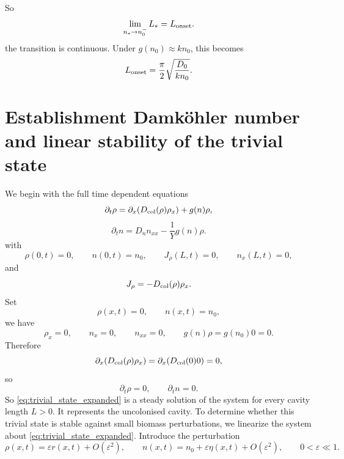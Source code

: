 \documentclass[11pt,a4paper]{report}
\begin{document}
	So
	\begin{equation}
		{
			\lim_{n_*\to n_0^-}L_*
			=
			L_{\rm onset}.
		}
		\label{eq:Lstar_to_Lonset_box}
	\end{equation}
	the transition is continuous.
	Under $g(n_0)\approx kn_0$, this becomes
	\[
	L_{\rm onset}
	=
	\frac{\pi}{2}\sqrt{\frac{D_0}{kn_0}}.
	\]	
	
	\section{Establishment Damköhler number and linear stability of the trivial state}
	\label{sec:trivial}
	We begin with the full time dependent equations
	\begin{equation}
		\partial_t \rho
		=
		\partial_x\!\left(D_{\rm col}(\rho)\rho_x\right)
		+
		g(n)\rho,
		\label{eq:full_biomass_time_expanded}
	\end{equation}
	\begin{equation}
		\partial_t n
		=
		D_n n_{xx}
		-
		\frac{1}{Y}g(n)\rho.
		\label{eq:full_nutrient_time_expanded}
	\end{equation}
	with
	\begin{equation}
		\rho(0,t)=0,
		\qquad
		n(0,t)=n_0,
		\qquad
		J_\rho(L,t)=0,
		\qquad
		n_x(L,t)=0,
	\end{equation}
	and
	\begin{equation}
		J_\rho=-D_{\rm col}(\rho)\rho_x.
	\end{equation}
	Set
	\begin{equation}
		\rho(x,t)= 0,
		\qquad
		n(x,t)= n_0,
		\label{eq:trivial_state_expanded}
	\end{equation}
	we have
	\[
	\rho_x=0,
	\qquad
	n_x=0,
	\qquad
	n_{xx}=0,
	\qquad
	g(n)\rho=g(n_0) 0 = 0.
	\]
	Therefore
	\[
	\partial_x\!\left(D_{\rm col}(\rho)\rho_x\right)
	=
	\partial_x\!\left(D_{\rm col}(0) 0\right)=0,
	\]
	so
	\[
	\partial_t\rho=0,
	\qquad
	\partial_t n=0.
	\]
	So \eqref{eq:trivial_state_expanded} is a steady solution of the system for every cavity length $L>0$. It represents the uncolonised cavity.
	To determine whether this trivial state is stable against small biomass perturbations, we linearize the system about \eqref{eq:trivial_state_expanded}. Introduce the perturbation \cite{Murray} \cite{Leveque}
	\begin{equation}
		\rho(x,t)
		=
		\varepsilon r(x,t)+O(\varepsilon^2),
		\qquad
		n(x,t)
		=
		n_0+\varepsilon \eta(x,t)+O(\varepsilon^2),
		\qquad
		0<\varepsilon\ll 1.
		\label{eq:small_perturbation_ansatz_expanded}
	\end{equation}
\end{document}
